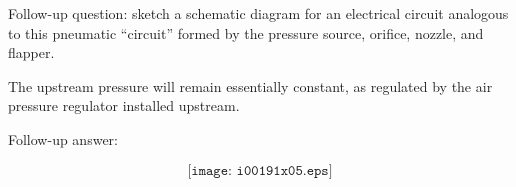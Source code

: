 \vskip 10pt

Follow-up question: sketch a schematic diagram for an electrical circuit analogous to this pneumatic ``circuit'' formed by the pressure source, orifice, nozzle, and flapper.







The upstream pressure will remain essentially constant, as regulated by the air pressure regulator installed upstream.

\vskip 10pt

Follow-up answer:

$$\texttt{[image: i00191x05.eps]}$$




